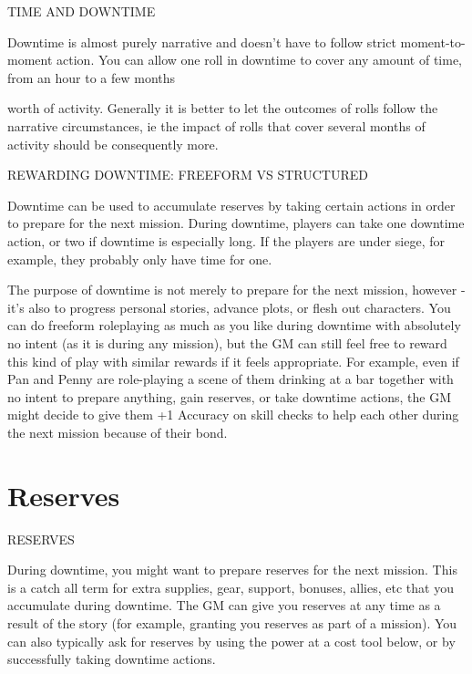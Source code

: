                                            TIME AND DOWNTIME
 

Downtime is almost purely narrative and doesn’t have to follow strict moment-to-moment action.  
You can allow one roll in downtime to cover any amount of time, from an hour to a few months  

                                                                                                                


worth of activity. Generally it is better to let the outcomes of rolls follow the narrative  
circumstances, ie the impact of rolls that cover several months of activity should be  
consequently more.
 

                      REWARDING DOWNTIME: FREEFORM VS STRUCTURED
 

Downtime can be used to accumulate reserves by taking certain actions in order to prepare for  
the next mission. During downtime, players can take one downtime action, or two if downtime is  
especially long. If the players are under siege, for example, they probably only have time for one.
 

The purpose of downtime is not merely to prepare for the next mission, however - it’s also to  
progress personal stories, advance plots, or flesh out characters. You can do freeform  
roleplaying as much as you like during downtime with absolutely no intent (as it is during any  
mission), but the GM can still feel free to reward this kind of play with similar rewards if it  
feels appropriate. For example, even if Pan and Penny are role-playing a scene of them drinking  
at a bar together with no intent to prepare anything, gain reserves, or take downtime actions, the  
GM might decide to give them +1 Accuracy on skill checks to help each other during the next  
mission because of their bond.
 

\section{Reserves}
                                                 RESERVES  

During downtime, you might want to prepare reserves for the next mission. This is a catch all  
term for extra supplies, gear, support, bonuses, allies, etc that you accumulate during downtime.  
The GM can give you reserves at any time as a result of the story (for example, granting you  
reserves as part of a mission). You can also typically ask for reserves by using the power at a  
cost tool below, or by successfully taking downtime actions.
 

